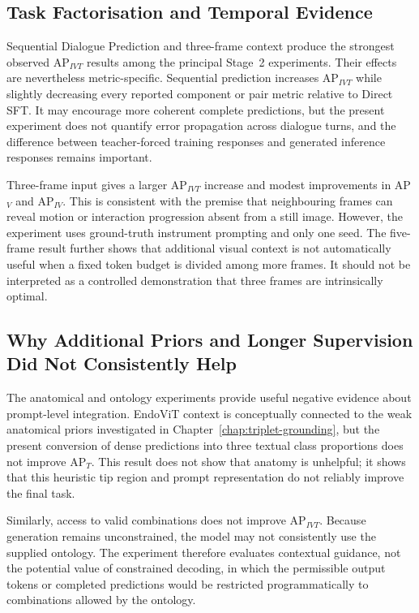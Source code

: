 \subsection{Task Factorisation and Temporal Evidence}

Sequential Dialogue Prediction and three-frame context produce the strongest observed AP$_{IVT}$ results among the principal Stage~2 experiments. Their effects are nevertheless metric-specific. Sequential prediction increases AP$_{IVT}$ while slightly decreasing every reported component or pair metric relative to Direct SFT. It may encourage more coherent complete predictions, but the present experiment does not quantify error propagation across dialogue turns, and the difference between teacher-forced training responses and generated inference responses remains important.

Three-frame input gives a larger AP$_{IVT}$ increase and modest improvements in AP$_V$ and AP$_{IV}$. This is consistent with the premise that neighbouring frames can reveal motion or interaction progression absent from a still image. However, the experiment uses ground-truth instrument prompting and only one seed. The five-frame result further shows that additional visual context is not automatically useful when a fixed token budget is divided among more frames. It should not be interpreted as a controlled demonstration that three frames are intrinsically optimal.

\subsection{Why Additional Priors and Longer Supervision Did Not Consistently Help}

The anatomical and ontology experiments provide useful negative evidence about prompt-level integration. EndoViT context is conceptually connected to the weak anatomical priors investigated in Chapter~\ref{chap:triplet-grounding}, but the present conversion of dense predictions into three textual class proportions does not improve AP$_T$. This result does not show that anatomy is unhelpful; it shows that this heuristic tip region and prompt representation do not reliably improve the final task.

Similarly, access to valid \vtpair combinations does not improve AP$_{IVT}$. Because generation remains unconstrained, the model may not consistently use the supplied ontology. The experiment therefore evaluates contextual guidance, not the potential value of constrained decoding, in which the permissible output tokens or completed predictions would be restricted programmatically to combinations allowed by the ontology.

